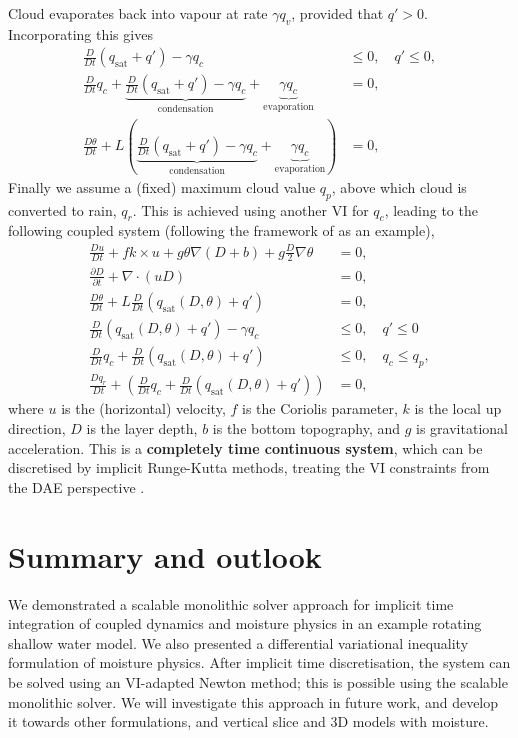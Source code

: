 \documentclass[
]{ImperialPoster}
\DeclareMathOperator{\sat}{sat}
\newcommand{\pp}[2]{\frac{\partial #1}{\partial #2}}
\newcommand{\DD}[2]{\frac{D #1}{D #2}}
\begin{document}
\begin{multicols}{3}
Cloud evaporates back into vapour at rate $\gamma q_v$, provided that
$q'>0$. Incorporating this gives
\begin{align*}
  \DD{}{t}(q_{\sat}+q') - \gamma q_c & \leq 0, \quad
  q' \leq 0, \\
  \DD{}{t}q_c + \underbrace{\DD{}{t}(q_{\sat}+q') - \gamma q_c}_{\mbox{condensation}} + \underbrace{\gamma q_c}_{\mbox{evaporation}} & = 0, \\
  \DD{\theta}{t} + L\left(
  \underbrace{\DD{}{t}(q_{\sat}+q') - \gamma q_c}_{\mbox{condensation}} + \underbrace{\gamma q_c}_{\mbox{evaporation}}\right) & = 0, 
\end{align*}
Finally we assume a (fixed) maximum cloud value $q_p$, above which
cloud is converted to rain, $q_r$. This is achieved using another VI
for $q_c$, leading to the following
coupled system (following the framework of \cite{zerroukat2015moist} as an example),
\begin{align*}
  \DD{u}{t} + fk\times u + g\theta \nabla (D+b) + g\frac{D}{2}\nabla \theta
  & = 0, \\
  \pp{D}{t} + \nabla\cdot(uD) & = 0, \\
  \DD{\theta}{t} + L\DD{}{t}(q_{\sat}(D,\theta)+q') & = 0, \\
  \DD{}{t}(q_{\sat}(D,\theta)+q') - \gamma q_c & \leq 0, \quad q'\leq 0 \\
  \DD{}{t}q_c + \DD{}{t}(q_{\sat}(D,\theta)+q') & \leq 0, \quad
  q_c \leq q_p, \\
  \DD{q_r}{t} + \left(\DD{}{t}q_c + \DD{}{t}(q_{\sat}(D,\theta)+q')\right) & = 0,
\end{align*}
where $u$ is the (horizontal) velocity, $f$ is the Coriolis parameter,
$k$ is the local up direction, $D$ is the layer depth, $b$ is the
bottom topography, and $g$ is gravitational acceleration. This is a
{\bfseries completely time continuous system}, which can be discretised by
implicit Runge-Kutta methods, treating
the VI constraints from the DAE perspective \cite{kirby2024extending}.

\section{Summary and outlook}

We demonstrated a scalable monolithic solver approach for implicit
time integration of coupled dynamics and moisture physics in an
example rotating shallow water model.  We also presented a
differential variational inequality formulation of moisture
physics. After implicit time discretisation, the system can be solved
using an VI-adapted Newton method; this is possible using the scalable
monolithic solver. We will investigate this approach in future work,
and develop it towards other formulations, and vertical slice and 3D
models with moisture.


\end{multicols}
\end{document}

